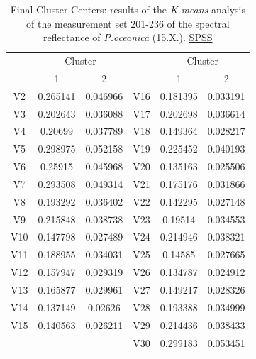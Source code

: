 \documentclass[11pt]{article}
\begin{document}
\begin{appendices}
\begin{table}[H]
	\caption{Final Cluster Centers: results of the \textit{K-means} analysis of the measurement set 201-236 of the spectral reflectance of \textit{P.oceanica} (15.X.).  \href{http://www.spss.com/}{SPSS}}
	\begin{center}
	\begin{tabular}{|c|c|c|c|c|c|}
	\hline\hline
		& \multicolumn{2}{|c|}{Cluster} &  & \multicolumn{2}{|c|}{Cluster}\\
		 & 1 & 2 &  & 1 & 2 \\ \hline\hline
		V2  &	0.265141 &	0.046966 &	V16 &	0.181395 &	0.033191 \\ \hline
		V3 &	0.202643 &	0.036088 &	V17 &	0.202698 &	0.036614 \\ \hline
		V4 &	0.20699 &	0.037789 &	V18 &	0.149364 &	0.028217 \\ \hline
		V5 &	0.298975 &	0.052158 &	V19 &	0.225452 &	0.040193 \\ \hline
		V6 &	0.25915 &	0.045968 &	V20 &	0.135163 &	0.025506 \\ \hline
		V7 &	0.293508 &	0.049314 &	V21 &	0.175176 &	0.031866 \\ \hline
		V8 &	0.193292 &	0.036402 &	V22 &	0.142295 &	0.027148 \\ \hline
		V9 &	0.215848 &	0.038738 &	V23 &	0.19514 &	0.034553 \\ \hline
		V10 &	0.147798 &	0.027489 &	V24 &	0.214946 &	0.038321 \\ \hline
		V11 &	0.188955 &	0.034031 &	V25 &	0.14585 &	0.027665 \\ \hline
		V12 &	0.157947 &	0.029319 &	V26 &	0.134787 &	0.024912 \\ \hline
		V13 &	0.165877 &	0.029961 &	V27 &	0.149217 &	0.028326 \\ \hline
		V14 &	0.137149 &	0.02626 &	V28 &	0.193388 &	0.034999 \\ \hline
		V15 &	0.140563 &	0.026211 &	V29 &	0.214436 &	0.038433 \\ \hline
		 &	 &	 &	V30	 & 0.299183	 & 0.053451 \\ \hline
	\end{tabular}
	\end{center}
	\label{tab:23}
\end{table}
\pagebreak


\end{appendices}
\end{document}
